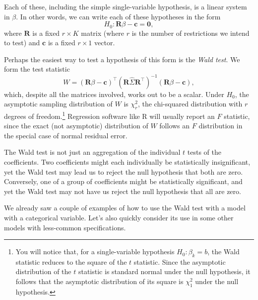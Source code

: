 \documentclass[12pt,oneside,openany]{book}
\let\rmarkdownfootnote\footnote%
\def\footnote{\protect\rmarkdownfootnote}
\begin{document}
Each of these, including the simple single-variable hypothesis, is a
linear system in \(\beta\). In other words, we can write each of these
hypotheses in the form \[
H_0 : \mathbf{R} \beta - \mathbf{c} = \mathbf{0},
\] where \(\mathbf{R}\) is a fixed \(r \times K\) matrix (where \(r\) is
the number of restrictions we intend to test) and \(\mathbf{c}\) is a
fixed \(r \times 1\) vector.

Perhaps the easiest way to test a hypothesis of this form is the
\emph{Wald test}. We form the test statistic \[
W = (\mathbf{R} \beta - \mathbf{c})^\top  (\mathbf{R} \hat{\Sigma} \mathbf{R}^\top)^{-1} (\mathbf{R} \beta - \mathbf{c}),
\] which, despite all the matrices involved, works out to be a scalar.
Under \(H_0\), the asymptotic sampling distribution of \(W\) is
\(\chi^2_r\), the chi-squared distribution with \(r\) degrees of
freedom.\footnote{You will notice that, for a single-variable hypothesis
  \(H_0 : \beta_k = b\), the Wald statistic reduces to the square of the
  \(t\) statistic. Since the asymptotic distribution of the \(t\)
  statistic is standard normal under the null hypothesis, it follows
  that the asymptotic distribution of its square is \(\chi^2_1\) under
  the null hypothesis.} Regression software like R will usually report
an \(F\) statistic, since the exact (not asymptotic) distribution of
\(W\) follows an \(F\) distribution in the special case of normal
residual error.

The Wald test is not just an aggregation of the individual \(t\) tests
of the coefficients. Two coefficients might each individually be
statistically insignificant, yet the Wald test may lead us to reject the
null hypothesis that both are zero. Conversely, one of a group of
coefficients might be statistically significant, and yet the Wald test
may not have us reject the null hypothesis that all are zero.

We already saw a couple of examples of how to use the Wald test with a
model with a categorical variable. Let's also quickly consider its use
in some other models with less-common specifications.
\end{document}
